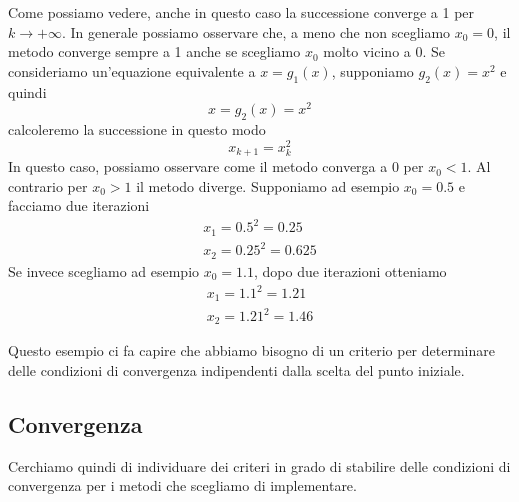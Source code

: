 \begin{example}
\begin{center}
	\end{center}
	Come possiamo vedere, anche in questo caso la successione converge a 1 per $k \to +\infty$. In generale
	possiamo osservare che, a meno che non scegliamo $x_0 = 0$, il metodo converge sempre a 1 anche se scegliamo
	$x_0$ molto vicino a 0. Se consideriamo un'equazione equivalente a $x = g_1(x)$, supponiamo $g_2(x) = x^2$
	e quindi
	\[ x = g_2(x) = x^2 \]
	calcoleremo la successione in questo modo
	\[ x_{k+1} = x_k^2 \]
	In questo caso, possiamo osservare come il metodo converga a 0 per $x_0 < 1$. Al contrario per $x_0 > 1$ il
	metodo diverge. Supponiamo ad esempio $x_0 = 0.5$ e facciamo due iterazioni
	\begin{gather*}
		x_1 = 0.5^2 = 0.25 \\
		x_2 = 0.25^2 = 0.625
	\end{gather*}
	Se invece scegliamo ad esempio $x_0 = 1.1$, dopo due iterazioni otteniamo
	\begin{gather*}
		x_1 = 1.1^2 = 1.21 \\
		x_2 = 1.21^2 = 1.46
	\end{gather*}
\end{example}

Questo esempio ci fa capire che abbiamo bisogno di un criterio per determinare delle condizioni di convergenza
indipendenti dalla scelta del punto iniziale.

\subsection{Convergenza}
Cerchiamo quindi di individuare dei criteri in grado di stabilire delle condizioni di convergenza per i metodi
che scegliamo di implementare.

